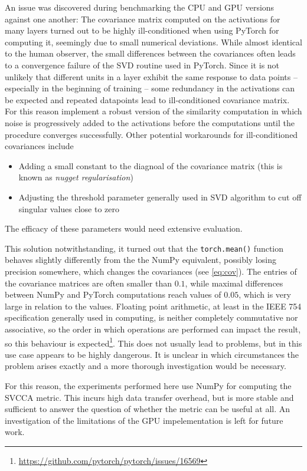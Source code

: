 An issue was discovered during benchmarking the CPU and GPU versions against one
another: The covariance matrix computed on the activations for many layers
turned out to be highly ill-conditioned when using PyTorch for computing it,
seemingly due to small numerical deviations. While almost identical to the human
observer, the small differences between the covariances often leads to a
convergence failure of the SVD routine used in PyTorch. Since it is not unlikely
that different units in a layer exhibit the same response to data points --
especially in the beginning of training -- some redundancy in the activations
can be expected and repeated datapoints lead to ill-conditioned covariance
matrix. For this reason \citeauthor{raghu2017svcca} implement a robust version
of the similarity computation in which noise is progressively added to the
activations before the computations until the procedure converges successfully.
Other potential workarounds for ill-conditioned covariances include
\begin{itemize}
    \item Adding a small constant to the diagnoal of the covariance matrix (this
        is known as \emph{nugget regularisation})
    \item Adjusting the threshold parameter generally used in SVD algorithm to
        cut off singular values close to zero
\end{itemize}
The efficacy of these parameters would need extensive evaluation.

This solution notwithstanding, it turned out
that the \texttt{torch.mean()} function behaves slightly differently from the
the NumPy equivalent, possibly losing precision somewhere, which changes the
covariances (see \cref{eq:cov}).  The entries of the covariance matrices are
often smaller than $0.1$, while maximal differences between NumPy and PyTorch
computations reach values of $0.05$, which is very large in relation to the
values.
Floating point arithmetic, at least in the IEEE 754 specification generally used
in computing, is neither completely commutative nor associative, so the order in
which operations are performed can impact the result, so this behaviour is
expected\footnote{\url{https://github.com/pytorch/pytorch/issues/16569}}. This
does not usually lead to problems, but in this use case appears to be highly
dangerous. It is unclear in which circumstances the problem arises exactly and a
more thorough investigation would be necessary.

For this reason, the experiments
performed here use NumPy for computing the SVCCA metric. This incurs high data
transfer overhead, but is more stable and sufficient to answer the question of whether the
metric can be useful at all. An investigation of the limitations of the GPU
impelementation is left for future work.


